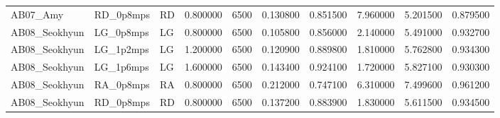 \begin{table}
\begin{tabular}{lllrrrrrrr}
AB07\_Amy & RD\_0p8mps & RD & 0.800000 & 6500 & 0.130800 & 0.851500 & 7.960000 & 5.201500 & 0.879500 \\
AB08\_Seokhyun & LG\_0p8mps & LG & 0.800000 & 6500 & 0.105800 & 0.856000 & 2.140000 & 5.491000 & 0.932700 \\
AB08\_Seokhyun & LG\_1p2mps & LG & 1.200000 & 6500 & 0.120900 & 0.889800 & 1.810000 & 5.762800 & 0.934300 \\
AB08\_Seokhyun & LG\_1p6mps & LG & 1.600000 & 6500 & 0.143400 & 0.924100 & 1.720000 & 5.827100 & 0.930300 \\
AB08\_Seokhyun & RA\_0p8mps & RA & 0.800000 & 6500 & 0.212000 & 0.747100 & 6.310000 & 7.499600 & 0.961200 \\
AB08\_Seokhyun & RD\_0p8mps & RD & 0.800000 & 6500 & 0.137200 & 0.883900 & 1.830000 & 5.611500 & 0.934500 \\
\bottomrule
\end{tabular}
\end{table}
